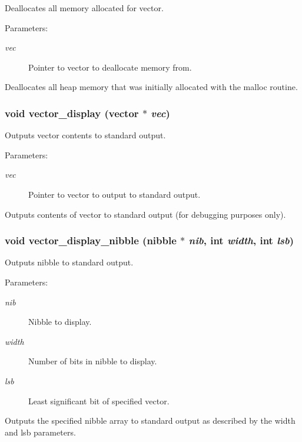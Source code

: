 Deallocates all memory allocated for vector.

\begin{Desc}
\item[Parameters: ]\par
\begin{description}
\item[{\em 
vec}]Pointer to vector to deallocate memory from.\end{description}
\end{Desc}
Deallocates all heap memory that was initially allocated with the malloc routine. 
\subsubsection{\setlength{\rightskip}{0pt plus 5cm}void vector\_\-display ({\bf vector} $\ast$ {\em vec})}\label{vector_8h_a9}


Outputs vector contents to standard output.

\begin{Desc}
\item[Parameters: ]\par
\begin{description}
\item[{\em 
vec}]Pointer to vector to output to standard output.\end{description}
\end{Desc}
Outputs contents of vector to standard output (for debugging purposes only). 
\subsubsection{\setlength{\rightskip}{0pt plus 5cm}void vector\_\-display\_\-nibble ({\bf nibble} $\ast$ {\em nib}, int {\em width}, int {\em lsb})}\label{vector_8h_a8}


Outputs nibble to standard output.

\begin{Desc}
\item[Parameters: ]\par
\begin{description}
\item[{\em 
nib}]Nibble to display. \item[{\em 
width}]Number of bits in nibble to display. \item[{\em 
lsb}]Least significant bit of specified vector.\end{description}
\end{Desc}
Outputs the specified nibble array to standard output as described by the width and lsb parameters. 
